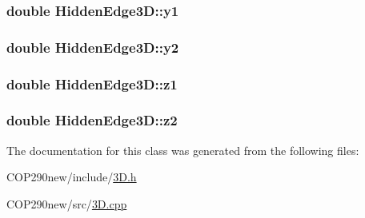 \subsubsection[{\texorpdfstring{y1}{y1}}]{\setlength{\rightskip}{0pt plus 5cm}double Hidden\+Edge3\+D\+::y1}\hypertarget{class_hidden_edge3_d_a40b67744e7d07d47204599c5481f5d2e}{}\label{class_hidden_edge3_d_a40b67744e7d07d47204599c5481f5d2e}
\subsubsection[{\texorpdfstring{y2}{y2}}]{\setlength{\rightskip}{0pt plus 5cm}double Hidden\+Edge3\+D\+::y2}\hypertarget{class_hidden_edge3_d_ab8a6f5b37b5b208042307a8a1060bd0d}{}\label{class_hidden_edge3_d_ab8a6f5b37b5b208042307a8a1060bd0d}
\subsubsection[{\texorpdfstring{z1}{z1}}]{\setlength{\rightskip}{0pt plus 5cm}double Hidden\+Edge3\+D\+::z1}\hypertarget{class_hidden_edge3_d_ad8b9d5b2867873171153447a1f75204e}{}\label{class_hidden_edge3_d_ad8b9d5b2867873171153447a1f75204e}
\subsubsection[{\texorpdfstring{z2}{z2}}]{\setlength{\rightskip}{0pt plus 5cm}double Hidden\+Edge3\+D\+::z2}\hypertarget{class_hidden_edge3_d_a6e4a7847916c1849577b18d5823c5e50}{}\label{class_hidden_edge3_d_a6e4a7847916c1849577b18d5823c5e50}


The documentation for this class was generated from the following files\+:\begin{DoxyCompactItemize}
\item 
C\+O\+P290new/include/\hyperlink{3_d_8h}{3\+D.\+h}\item 
C\+O\+P290new/src/\hyperlink{3_d_8cpp}{3\+D.\+cpp}\end{DoxyCompactItemize}
